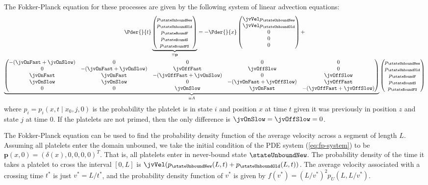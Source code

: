 The Fokker-Planck equation for these processes are given by the
following system of linear advection equations:
\begin{multline}
  \label{eq:fp-system}
  \Pder{}{t}
  \underbrace{
    \begin{pmatrix}
      p_{\stateUnboundNew} \\ p_{\stateUnboundOld} \\ p_\stateBoundF \\
      p_\stateBoundS \\ p_\stateBoundFS
    \end{pmatrix}}_{\equiv \mathbf{p}}
  =
  -\Pder{}{x}
  \begin{pmatrix}
    \jvVel p_{\stateUnboundNew} \\ \jvVel p_{\stateUnboundOld} \\ 0 \\
    0 \\ 0
  \end{pmatrix}
  + \\
  \underbrace{
    \begin{pmatrix}
      -(\jvOnFast + \jvOnSlow) & 0 & 0 & 0 & 0 \\
      0 & -(\jvOnFast + \jvOnSlow) & \jvOffFast & \jvOffSlow & 0 \\
      \jvOnFast & \jvOnFast & -(\jvOffFast + \jvOnSlow) & 0 & \jvOffSlow \\
      \jvOnSlow & \jvOnSlow & 0 & -(\jvOnFast + \jvOffSlow) & \jvOffFast \\
      0 & 0 & \jvOnSlow & \jvOnFast & -(\jvOffFast + \jvOffSlow)
  \end{pmatrix}}_{\equiv A}
  \begin{pmatrix}
    p_{\stateUnboundNew} \\ p_{\stateUnboundOld} \\ p_\stateBoundF \\
    p_\stateBoundS \\ p_\stateBoundFS
  \end{pmatrix}
\end{multline}
where $p_i = p_i(x, t \mid x_0, j, 0)$ is the probability the platelet
is in state $i$ and position $x$ at time $t$ given it was previously in
position $z$ and state $j$ at time $0$. If the platelets are not primed,
then the only difference is $\jvOnSlow = \jvOffSlow = 0$.

The Fokker-Planck equation can be used to find the probability density
function of the average velocity across a segment of length
$L$. Assuming all platelets enter the domain unbouned, we take the
initial condition of the PDE system (\ref{eq:fp-system}) to be
$\mathbf{p}(x, 0) = (\delta(x), 0, 0, 0, 0)^T$. That is, all platelets
enter in never-bound state $\stateUnboundNew$. The probability density
of the time it takes a platelet to cross the interval $[0, L]$ is
$\jvVel (p_{\stateUnboundNew}(L, t) + p_{\stateUnboundOld}(L,t))$. The
average velocity associated with a crossing time $t^*$ is just
$v^* = L/t^*$, and the probability density function of $v^*$ is given by
$f(v^*) = (L/v^*)^2 p_U(L, L/v^*)$. 

